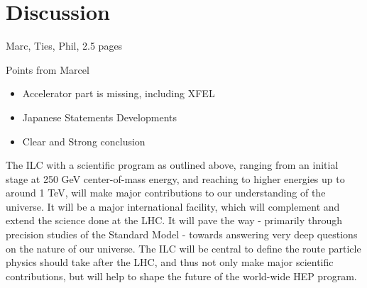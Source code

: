 \documentclass[%
 reprint,
 amsmath,amssymb,
 aps,
]{revtex4-1}
\begin{document}

\section{\label{sec:discussion}Discussion}

Marc, Ties, Phil, 2.5 pages

Points from Marcel
\begin{itemize}
    \item Accelerator part is missing, including XFEL
    \item Japanese Statements Developments
    \item Clear and Strong conclusion
\end{itemize}





The ILC with a scientific program as outlined above, ranging from an initial stage at 250 GeV center-of-mass energy, and reaching to higher energies up to around 1 TeV, will make major contributions to our understanding of the universe. It will be a major international facility, which will complement and extend the science done at the LHC. It will pave the way - primarily through precision studies of the Standard Model - towards answering very deep questions on the nature of our universe. The ILC will be central to define the route particle physics should take after the LHC, and thus not only make major scientific contributions, but will help to shape the future of the world-wide HEP program. 
\end{document}
